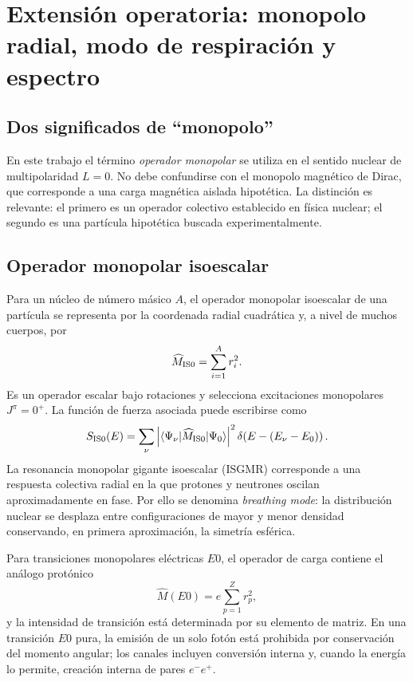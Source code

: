 \documentclass[11pt]{amsart}
\theoremstyle{definition}
\theoremstyle{remark}
\begin{document}
\section{Extensión operatoria: monopolo radial, modo de respiración y espectro}\label{sec:monopolo}
\subsection{Dos significados de ``monopolo''}
En este trabajo el término \emph{operador monopolar} se utiliza en el sentido nuclear de multipolaridad $L=0$. No debe confundirse con el monopolo magnético de Dirac, que corresponde a una carga magnética aislada hipotética. La distinción es relevante: el primero es un operador colectivo establecido en física nuclear; el segundo es una partícula hipotética buscada experimentalmente.

\subsection{Operador monopolar isoescalar}
Para un núcleo de número másico $A$, el operador monopolar isoescalar de una partícula se representa por la coordenada radial cuadrática y, a nivel de muchos cuerpos, por
\begin{equation}\label{eq:mis0}
  \widehat M_{\rm IS0}=\sum_{i=1}^{A} r_i^2 .
\end{equation}
Es un operador escalar bajo rotaciones y selecciona excitaciones monopolares $J^\pi=0^+$. La función de fuerza asociada puede escribirse como
\begin{equation}\label{eq:monostrength}
 S_{\rm IS0}(E)=\sum_{\nu}
 \left|\langle \Psi_\nu|\widehat M_{\rm IS0}|\Psi_0\rangle\right|^2
 \delta\!\left(E-(E_\nu-E_0)\right).
\end{equation}
La resonancia monopolar gigante isoescalar (ISGMR) corresponde a una respuesta colectiva radial en la que protones y neutrones oscilan aproximadamente en fase. Por ello se denomina \emph{breathing mode}: la distribución nuclear se desplaza entre configuraciones de mayor y menor densidad conservando, en primera aproximación, la simetría esférica.

Para transiciones monopolares eléctricas $E0$, el operador de carga contiene el análogo protónico
\begin{equation}\label{eq:e0op}
  \widehat M(E0)=e\sum_{p=1}^{Z} r_p^2,
\end{equation}
y la intensidad de transición está determinada por su elemento de matriz. En una transición $E0$ pura, la emisión de un solo fotón está prohibida por conservación del momento angular; los canales incluyen conversión interna y, cuando la energía lo permite, creación interna de pares $e^-e^+$.
\end{document}
